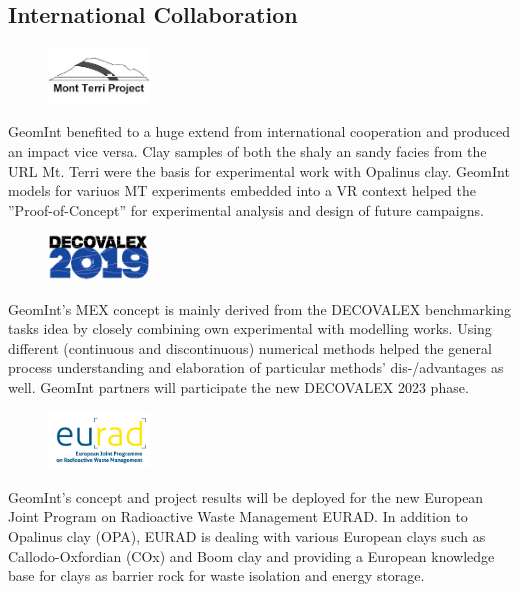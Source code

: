 \clearpage

\subsection{International Collaboration}

\begin{figure}
\vspace{-5mm}
\centering
\includegraphics[width=0.24\textwidth]{figures/mont-terri}
\label{fig:workflows}
\end{figure}
GeomInt benefited to a huge extend from international cooperation and produced an impact vice versa. Clay samples of both the shaly an sandy facies from the URL Mt. Terri were the basis for experimental work with Opalinus clay. GeomInt models for variuos MT experiments embedded into a VR context helped the ''Proof-of-Concept'' for experimental analysis and design of future campaigns.

\begin{figure}
\vspace{-1mm}
\centering
\includegraphics[width=0.24\textwidth]{figures/decovalex-2019}
\label{fig:workflows}
\end{figure}
GeomInt's MEX concept is mainly derived from the DECOVALEX benchmarking tasks idea by closely combining own experimental with modelling works. Using different (continuous and discontinuous) numerical methods helped the general process understanding and elaboration of particular methods' dis-/advantages as well. GeomInt partners will participate the new DECOVALEX 2023 phase. 

\begin{figure}
\vspace{-5mm}
\centering
\includegraphics[width=0.24\textwidth]{figures/eurad}
\label{fig:workflows}
\end{figure}
GeomInt's concept and project results will be deployed for the new European Joint Program on Radioactive Waste Management EURAD. In addition to Opalinus clay (OPA), EURAD is dealing with various European clays such as Callodo-Oxfordian (COx) and Boom clay and providing a European knowledge base for clays as barrier rock for waste isolation and energy storage.

